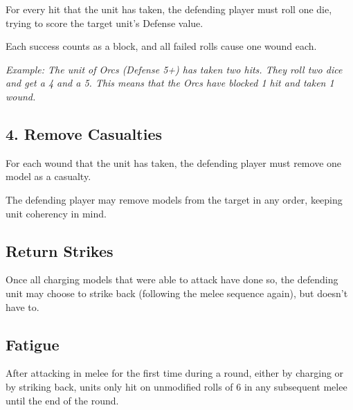 \documentclass[9pt, a4paper, bookmarks=false]{extarticle}            %
\begin{document}
\begin{multicols}{2}
For every hit that the unit has taken, the defending player must roll one die, trying to score the target unit’s Defense value.

Each success counts as a block, and all failed rolls cause one wound each.

\textit{Example: The unit of Orcs (Defense 5+) has taken two hits. They roll two dice and get a 4 and a 5. This means that the Orcs have blocked 1 hit and taken 1 wound.}

\subsection{4. Remove Casualties}

For each wound that the unit has taken, the defending player must remove one model as a casualty.

The defending player may remove models from the target in any order, keeping unit coherency in mind.

\subsection{Return Strikes}

Once all charging models that were able to attack have done so, the defending unit may choose to strike back (following the melee sequence again), but doesn’t have to.

\subsection{Fatigue}

After attacking in melee for the first time during a round, either by charging or by striking back, units only hit on unmodified rolls of 6 in any subsequent melee until the end of the round.

\end{multicols}

\newpage



\vspace*{0.2cm}
\end{document}
